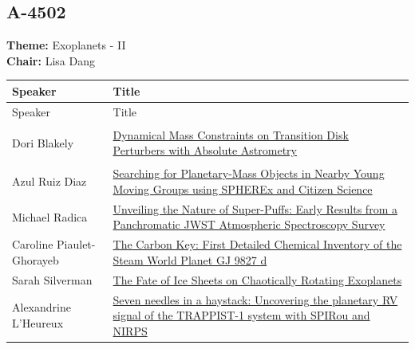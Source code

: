 \subsection*{A-4502}
\textbf{Theme:} Exoplanets - II\\
\textbf{Chair:} Lisa Dang\\
{\small
{}
\sloppy
\setlength{\emergencystretch}{1em}
\begin{longtable}{@{}>{\TableRaggedRight\arraybackslash\hspace{0pt}}p{} >{\TableRaggedRight\arraybackslash\hspace{0pt}}p{}@{}}
\toprule
Speaker & Title \\
\midrule
\endfirsthead
\toprule
Speaker & Title \\
\midrule
\endhead
\hypertarget{schedule-talk-31}{}\label{schedule-page-talk-31}Dori Blakely & \hyperlink{abstract-talk-31}{Dynamical Mass Constraints on Transition Disk Perturbers with Absolute Astrometry} \\
\hypertarget{schedule-talk-8}{}\label{schedule-page-talk-8}Azul Ruiz Diaz & \hyperlink{abstract-talk-8}{Searching for Planetary-Mass Objects in Nearby Young Moving Groups using SPHEREx and Citizen Science} \\
\hypertarget{schedule-talk-2}{}\label{schedule-page-talk-2}Michael Radica & \hyperlink{abstract-talk-2}{Unveiling the Nature of Super-Puffs: Early Results from a Panchromatic JWST Atmospheric Spectroscopy Survey} \\
\hypertarget{schedule-talk-126}{}\label{schedule-page-talk-126}Caroline Piaulet-Ghorayeb & \hyperlink{abstract-talk-126}{The Carbon Key: First Detailed Chemical Inventory of the Steam World Planet GJ 9827 d} \\
\hypertarget{schedule-talk-23}{}\label{schedule-page-talk-23}Sarah Silverman & \hyperlink{abstract-talk-23}{The Fate of Ice Sheets on Chaotically Rotating Exoplanets} \\
\hypertarget{schedule-talk-167}{}\label{schedule-page-talk-167}Alexandrine L'Heureux & \hyperlink{abstract-talk-167}{Seven needles in a haystack: Uncovering the planetary RV signal of the TRAPPIST-1 system with SPIRou and NIRPS} \\
\bottomrule
\end{longtable}
}

\hypertarget{schedule-wednesday-afternoon-a-3561}{}
